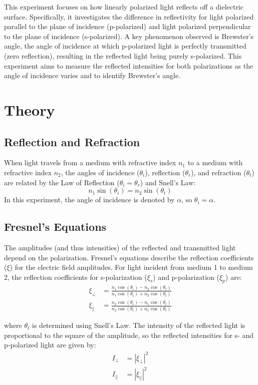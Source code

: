 \documentclass[journal]{IEEEtran}
\begin{document}
This experiment focuses on how linearly polarized light reflects off a dielectric surface. Specifically, it investigates the difference in reflectivity for light polarized parallel to the plane of incidence (p-polarized) and light polarized perpendicular to the plane of incidence (s-polarized). A key phenomenon observed is Brewster's angle, the angle of incidence at which p-polarized light is perfectly transmitted (zero reflection), resulting in the reflected light being purely s-polarized. This experiment aims to measure the reflected intensities for both polarizations as the angle of incidence varies and to identify Brewster's angle.

\section{Theory}
\subsection{Reflection and Refraction}
When light travels from a medium with refractive index $n_1$ to a medium with refractive index $n_2$, the angles of incidence ($\theta_i$), reflection ($\theta_r$), and refraction ($\theta_t$) are related by the Law of Reflection ($\theta_i = \theta_r$) and Snell's Law:
\begin{equation}
    n_1 \sin(\theta_i) = n_2 \sin(\theta_t)
\end{equation}
In this experiment, the angle of incidence is denoted by $\alpha$, so $\theta_i = \alpha$.

\subsection{Fresnel's Equations}
The amplitudes (and thus intensities) of the reflected and transmitted light depend on the polarization. Fresnel's equations describe the reflection coefficients ($\xi$) for the electric field amplitudes. For light incident from medium 1 to medium 2, the reflection coefficients for s-polarization ($\xi_s$) and p-polarization ($\xi_p$) are:
\begin{align}
    \xi_{\perp} &= \frac{n_1 \cos(\theta_i) - n_2 \cos(\theta_t)}{n_1 \cos(\theta_i) + n_2 \cos(\theta_t)} \\
    \xi_{\parallel} &= \frac{n_2 \cos(\theta_i) - n_1 \cos(\theta_t)}{n_2 \cos(\theta_i) + n_1 \cos(\theta_t)}
\end{align}

where $\theta_t$ is determined using Snell's Law. The intensity of the reflected light is proportional to the square of the amplitude, so the reflected intensities for s- and p-polarized light are given by:
\begin{align}
    I_{\perp} &= \left| \xi_{\perp} \right|^2 \\
    I_{\parallel} &= \left| \xi_{\parallel} \right|^2
\end{align}
\end{document}
